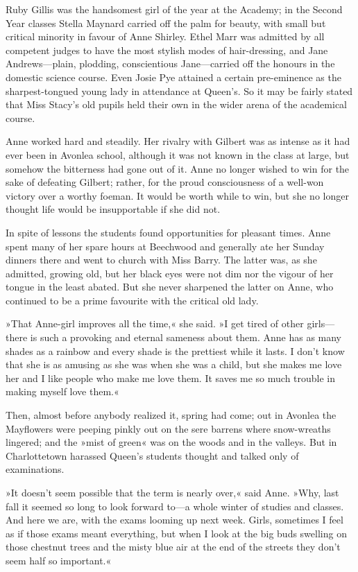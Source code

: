 Ruby Gillis was the handsomest girl of the year at the Academy; in the Second Year classes Stella Maynard carried off the palm for beauty, with small but critical minority in favour of Anne Shirley. Ethel Marr was admitted by all competent judges to have the most stylish modes of hair-dressing, and Jane Andrews—plain, plodding, conscientious Jane—carried off the honours in the domestic science course. Even Josie Pye attained a certain pre-eminence as the sharpest-tongued young lady in attendance at Queen's. So it may be fairly stated that Miss Stacy's old pupils held their own in the wider arena of the academical course.

Anne worked hard and steadily. Her rivalry with Gilbert was as intense as it had ever been in Avonlea school, although it was not known in the class at large, but somehow the bitterness had gone out of it. Anne no longer wished to win for the sake of defeating Gilbert; rather, for the proud consciousness of a well-won victory over a worthy foeman. It would be worth while to win, but she no longer thought life would be insupportable if she did not.

In spite of lessons the students found opportunities for pleasant times. Anne spent many of her spare hours at Beechwood and generally ate her Sunday dinners there and went to church with Miss Barry. The latter was, as she admitted, growing old, but her black eyes were not dim nor the vigour of her tongue in the least abated. But she never sharpened the latter on Anne, who continued to be a prime favourite with the critical old lady.

»That Anne-girl improves all the time,« she said. »I get tired of other girls—there is such a provoking and eternal sameness about them. Anne has as many shades as a rainbow and every shade is the prettiest while it lasts. I don't know that she is as amusing as she was when she was a child, but she makes me love her and I like people who make me love them. It saves me so much trouble in making myself love them.«

Then, almost before anybody realized it, spring had come; out in Avonlea the Mayflowers were peeping pinkly out on the sere barrens where snow-wreaths lingered; and the »mist of green« was on the woods and in the valleys. But in Charlottetown harassed Queen's students thought and talked only of examinations.

»It doesn't seem possible that the term is nearly over,« said Anne. »Why, last fall it seemed so long to look forward to—a whole winter of studies and classes. And here we are, with the exams looming up next week. Girls, sometimes I feel as if those exams meant everything, but when I look at the big buds swelling on those chestnut trees and the misty blue air at the end of the streets they don't seem half so important.«


